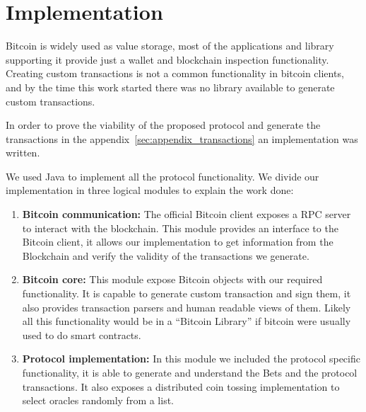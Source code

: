 \section{Implementation}

Bitcoin is widely used as value storage, most of the applications and library
  supporting it provide just a wallet and blockchain inspection functionality.
Creating custom transactions is not a common functionality in bitcoin clients,
  and by the time this work started there was no library available to generate
  custom transactions.

In order to prove the viability of the proposed protocol and generate the
  transactions in the appendix~\ref{sec:appendix_transactions} an implementation
  was written.

We used Java to implement all the protocol functionality.
We divide our implementation in three logical modules to explain the work done:
\begin{enumerate}
\item \textbf{Bitcoin communication:}
The official Bitcoin client exposes a RPC server to interact with the
  blockchain.
This module provides an interface to the Bitcoin client, it allows our
  implementation to get information from the Blockchain and verify the
  validity of the transactions we generate.

\item \textbf{Bitcoin core:}
This module expose Bitcoin objects with our required functionality.
It is capable to generate custom transaction and sign them, it also
  provides transaction parsers and human readable views of them.
Likely all this functionality would be in a ``Bitcoin Library'' if bitcoin
  were usually used to do smart contracts.

\item \textbf{Protocol implementation:}
In this module we included the protocol specific functionality, it is able
  to generate and understand the Bets and the protocol transactions.
It also exposes a distributed coin tossing implementation to select oracles
  randomly from a list.
\end{enumerate}

